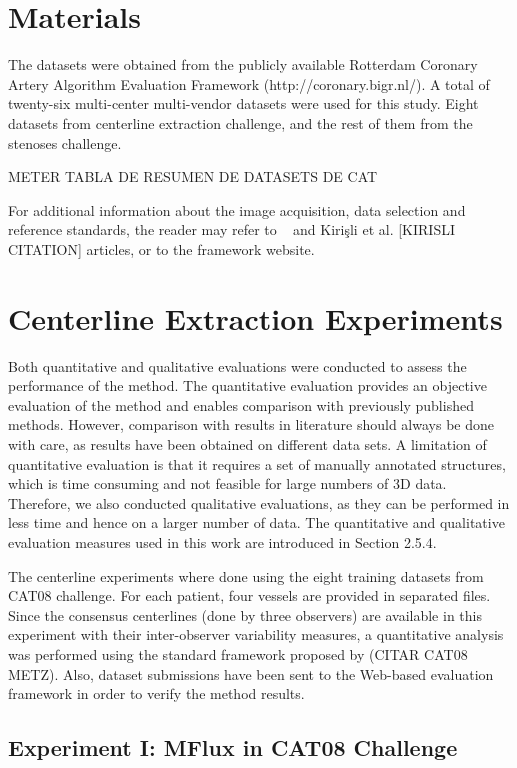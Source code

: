 \section{Materials}
 
The datasets were obtained from the publicly available Rotterdam Coronary Artery Algorithm Evaluation Framework (http://coronary.bigr.nl/). A total of twenty-six multi-center multi-vendor datasets were used for this study. Eight datasets from centerline extraction challenge, and the rest of them from the stenoses challenge. 

METER TABLA DE RESUMEN DE DATASETS DE CAT

For additional information about the image acquisition, data selection and reference standards, the reader may refer to ~\citep{Metz2008} and Kirişli et al. [KIRISLI CITATION] articles, or to the framework website.

\section{Centerline Extraction Experiments}

Both quantitative and qualitative evaluations were conducted to assess the performance of the method. The quantitative evaluation provides an objective evaluation of the method and enables comparison with previously published methods. However, comparison with results in literature should always be done with care, as results have been obtained on different data sets. A limitation of quantitative evaluation is that it requires a set of manually annotated structures, which is time consuming and not feasible for large numbers of 3D data. Therefore, we also conducted qualitative evaluations, as they can be performed in less time and hence on a larger number of data. The quantitative and qualitative evaluation measures used in this work are introduced in Section 2.5.4.

The centerline experiments where done using the eight training datasets from CAT08 challenge. For each patient, four vessels are provided in separated files. Since the consensus centerlines (done by three observers) are available in this experiment with their inter-observer variability measures, a quantitative analysis was performed using the standard framework proposed by (CITAR CAT08 METZ). Also, dataset submissions have been sent to the Web-based evaluation framework in order to verify the method results.

\subsection{Experiment I: MFlux in CAT08 Challenge}

